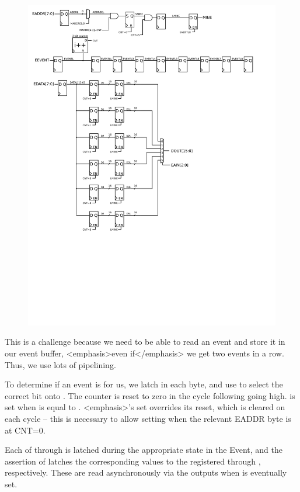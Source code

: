 \begin{figure}[h!]
\includegraphics[scale=0.8]{reader.svg}
\end{figure}
      
This is a challenge because we need to be able to read an event and
store it in our event buffer, <emphasis>even if</emphasis> we get two
events in a row. Thus, we use lots of pipelining.

To determine if an event is for us, we latch in each
 byte, and use 
to select the correct bit onto . The counter
 is reset to zero in the cycle following
 going high.  is set when
 is equal to .
<emphasis>'s set overrides its reset, which is
cleared on each cycle -- this is necessary to allow setting when the
relevant EADDR byte is at CNT=0. 

Each of  through  is
latched during the appropriate state in the Event, and the assertion
of  latches the corresponding values to the
registered  through
, respectively. These are read
asynchronously via the outputs when  is
eventually set.

